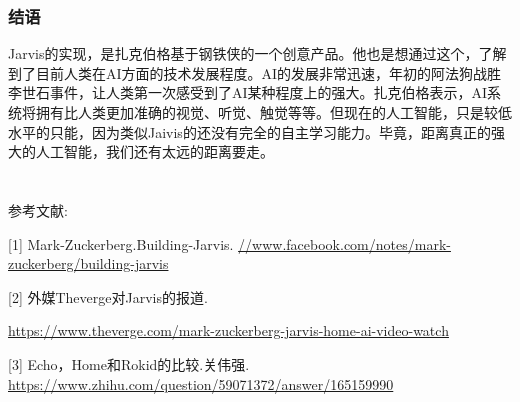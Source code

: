 \documentclass{ctexart} %
\begin{document}
\subsubsection*{结语}
  Jarvis的实现，是扎克伯格基于钢铁侠的一个创意产品。他也是想通过这个，了解到了目前人类在AI方面的技术发展程度。AI的发展非常迅速，年初的阿法狗战胜李世石事件，让人类第一次感受到了AI某种程度上的强大。扎克伯格表示，AI系统将拥有比人类更加准确的视觉、听觉、触觉等等。但现在的人工智能，只是较低水平的只能，因为类似Jaivis的还没有完全的自主学习能力。毕竟，距离真正的强大的人工智能，我们还有太远的距离要走。
\\ \\ \\ 参考文献:

[1] Mark-Zuckerberg.Building-Jarvis. \url{ //www.facebook.com/notes/mark-zuckerberg/building-jarvis} 

[2] 外媒Theverge对Jarvis的报道.

 \url{https://www.theverge.com/mark-zuckerberg-jarvis-home-ai-video-watch}

[3] Echo，Home和Rokid的比较.关伟强. \url{https://www.zhihu.com/question/59071372/answer/165159990}
\end{document}
